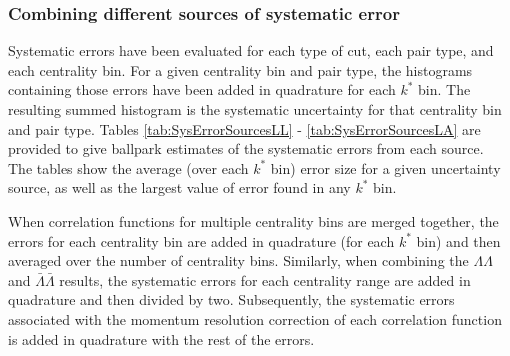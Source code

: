 %
%

\subsubsection{Combining different sources of systematic error}
\label{sec:CombiningSys}

Systematic errors have been evaluated for each type of cut, each pair type, and each centrality bin.  
For a given centrality bin and pair type, the histograms containing those errors have been added in quadrature for each $k^*$ bin.  
The resulting summed histogram is the systematic uncertainty for that centrality bin and pair type.  
Tables \ref{tab:SysErrorSourcesLL} - \ref{tab:SysErrorSourcesLA} are provided to give ballpark estimates of the systematic errors from each source.  
The tables show the average (over each $k^*$ bin) error size for a given uncertainty source, as well as the largest value of error found in any $k^*$ bin.

When correlation functions for multiple centrality bins are merged together, the errors for each centrality bin are added in quadrature (for each $k^*$ bin) and then averaged over the number of centrality bins.  
Similarly, when combining the $\Lambda\Lambda$ and $\bar{\Lambda}\bar{\Lambda}$ results, the systematic errors for each centrality range are added in quadrature and then divided by two.  
Subsequently, the systematic errors associated with the momentum resolution correction of each correlation function is added in quadrature with the rest of the errors.

